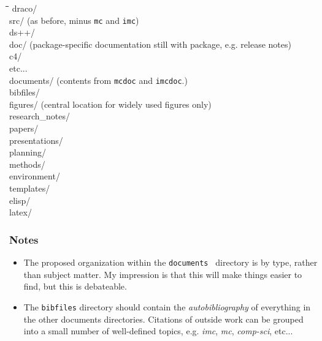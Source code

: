 \documentclass[11pt]{nmemo}
\begin{document}
{\ttfamily
\begin{tabbing}
  \hspace*{0.5cm}\=\hspace{0.5cm}\=\hspace{0.5cm}\=\hspace{0.5cm}\=\kill
  draco/ \\
  \> src/ ({\rmfamily as before, minus {\tt mc} and {\tt imc}}) \\
  \> \> ds++/ \\
  \> \> \> doc/ {(\rmfamily package-specific documentation still with
    package, e.g. release notes)} \\
  \> \> c4/ \\
  \> \> {\rmfamily etc...} \\
  \> documents/ ({\rmfamily contents from {\tt mcdoc} and {\tt imcdoc}.)}\\
  \> \> bibfiles/ \\
  \> \> figures/ ({\rmfamily central location for widely used figures only)}\\
  \> \> research\_notes/ \\
  \> \> papers/ \\
  \> \> presentations/ \\
  \> \> planning/ \\
  \> \> methods/ \\
  \> environment/ \\
  \> \> templates/ \\
  \> \> elisp/ \\
  \> \> latex/ \\
\end{tabbing}
}    

\subsubsection*{Notes}

\begin{itemize}

\item The proposed organization within the {\tt documents\ } directory
  is by type, rather than subject matter. My impression is that this
  will make things easier to find, but this is debateable.

\item The {\tt bibfiles} directory should contain the {\em
    autobibliography} of everything in the other documents
  directories. Citations of outside work can be grouped into a small
  number of well-defined topics, e.g. {\em imc}, {\em mc}, {\em
    comp-sci}, etc...

\end{itemize}
  
\end{document}

